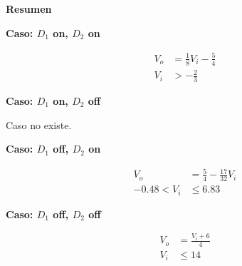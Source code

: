 \textbf{Resumen}

\textbf{Caso: $D_1$ on, $D_2$ on}

\begin{align*}
  V_o &= \frac{1}{8} V_i - \frac{5}{4}
  \\
  V_i &> -\frac{2}{3}
\end{align*}

\textbf{Caso: $D_1$ on, $D_2$ off}

Caso no existe.

\textbf{Caso: $D_1$ off, $D_2$ on}

\begin{align*}
  V_o &= \frac{5}{4} - \frac{17}{32} V_i
  \\
  -0.48 < V_i &\leq 6.83
\end{align*}

\textbf{Caso: $D_1$ off, $D_2$ off}

\begin{align*}
  V_o &= \frac{V_i + 6}{4}
  \\
  V_i &\leq 14
\end{align*}
